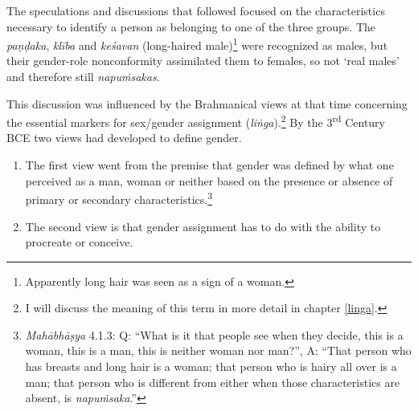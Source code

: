 The speculations and discussions that followed focused on the characteristics necessary to identify a person as belonging to one of the three groups. The {\em paṇḍaka}, {\em klība} and {\em keśavan} (long-haired male)\footnote{Apparently long hair was seen as a sign of a woman.} were recognized as males, but their gender-role nonconformity assimilated them to females, so not `real males' and therefore still {\em napuṁsakas}.

This discussion was influenced by the Brahmanical views at that time concerning the essential markers for sex/gender assignment ({\em liṅga}).\footnote{I will discuss the meaning of this term in more detail in chapter \ref{linga}.} By the 3\textsuperscript{rd} Century BCE two views had developed to define gender.

\begin{enumerate}
 \item The first view went from the premise that gender was defined by what one perceived as a man, woman or neither based on the presence or absence of primary or secondary characteristics.\footnote{{\em Mahābhāṣya} 4.1.3: Q: ``What is it that people see when they decide, this is a woman, this is a man, this is neither woman nor man?'', A: ``That person who has breasts and long hair is a woman; that person who is hairy all over is a man; that person who is different from either when those characteristics are absent, is {\em napuṁsaka}.''}
 \item The second view is that gender assignment has to do with the ability to procreate or conceive. 
\end{enumerate}

